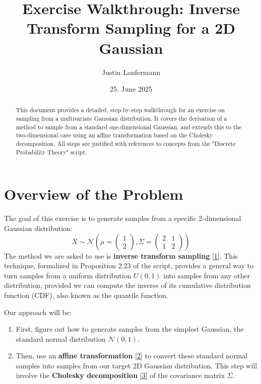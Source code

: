 \documentclass[11pt,a4paper]{article}
\title{Exercise Walkthrough: Inverse Transform Sampling for a 2D Gaussian}
\author{Justin Lanfermann}
\date{25. June 2025}
\newcommand{\N}{\mathcal{N}}
\begin{document}
\maketitle

\begin{abstract}
    This document provides a detailed, step-by-step walkthrough for an exercise on sampling from a multivariate Gaussian distribution. It covers the derivation of a method to sample from a standard one-dimensional Gaussian, and extends this to the two-dimensional case using an affine transformation based on the Cholesky decomposition. All steps are justified with references to concepts from the "Discrete Probability Theory" script.
\end{abstract}

\section{Overview of the Problem}

The goal of this exercise is to generate samples from a specific 2-dimensional Gaussian distribution:
\[ X \sim \N\left(\mu = \begin{pmatrix} 1 \\ 2 \end{pmatrix}, \Sigma = \begin{pmatrix} 2 & 1 \\ 1 & 2 \end{pmatrix}\right) \]
The method we are asked to use is \textbf{inverse transform sampling} \hyperlink{concept:its}{[1]}. This technique, formalized in Proposition 2.23 of the script, provides a general way to turn samples from a uniform distribution $U(0,1)$ into samples from any other distribution, provided we can compute the inverse of its cumulative distribution function (CDF), also known as the quantile function.

Our approach will be:
\begin{enumerate}
    \item First, figure out how to generate samples from the simplest Gaussian, the standard normal distribution $\N(0,1)$.
    \item Then, use an \textbf{affine transformation} \hyperlink{concept:affine}{[2]} to convert these standard normal samples into samples from our target 2D Gaussian distribution. This step will involve the \textbf{Cholesky decomposition} \hyperlink{concept:cholesky}{[3]} of the covariance matrix $\Sigma$.
\end{enumerate}
\end{document}
